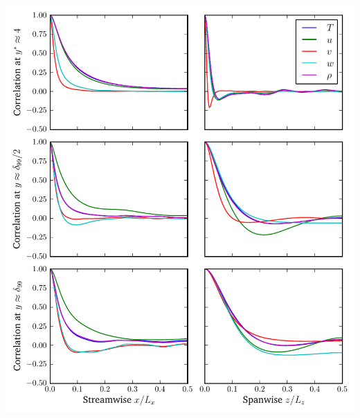 \documentclass[mathserif]{beamer}
\begin{document}
\begin{frame}
\begin{columns}
\begin{column}{0.5\linewidth}
          \includegraphics[width=\textwidth]{autocorr-turb4134}
        \end{column}
    \end{columns}
\end{frame}
\end{document}
